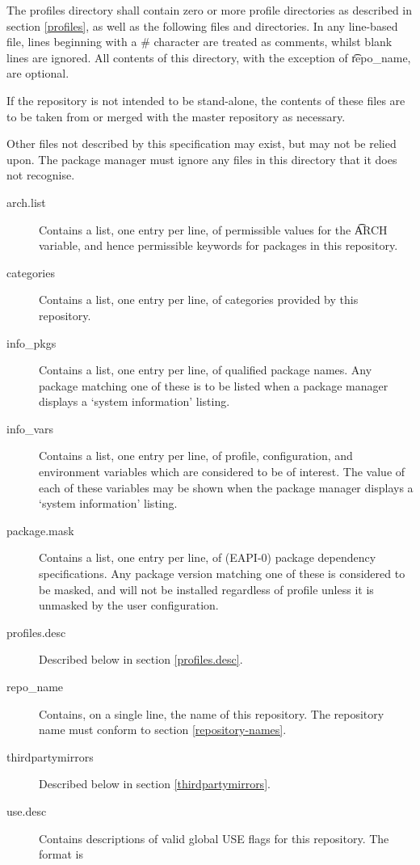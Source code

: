 The profiles directory shall contain zero or more profile directories as described in section
\ref{profiles}, as well as the following files and directories. In any line-based file, lines
beginning with a \# character are treated as comments, whilst blank lines are ignored. All contents
of this directory, with the exception of \t{repo\_name}, are optional.

If the repository is not intended to be stand-alone, the contents of these files are to be taken
from or merged with the master repository as necessary.

Other files not described by this specification may exist, but may not be relied upon. The package
manager must ignore any files in this directory that it does not recognise.

\begin{description}
\item[arch.list] \label{arch.list} Contains a list, one entry per line, of permissible values for
    the \t{ARCH} variable, and hence permissible keywords for packages in this repository.
\item[categories] \label{profiles-categories} Contains a list, one entry per line, of categories
    provided by this repository.
\item[info\_pkgs] Contains a list, one entry per line, of qualified package names. Any package
    matching one of these is to be listed when a package manager displays a `system information'
    listing.
\item[info\_vars] Contains a list, one entry per line, of profile, configuration, and environment
    variables which are considered to be of interest. The value of each of these variables may be
    shown when the package manager displays a `system information' listing.
\item[package.mask] \label{profiles-package.mask}
    Contains a list, one entry per line, of (EAPI-0) package dependency specifications. Any package
    version matching one of these is considered to be masked, and will not be installed regardless
    of profile unless it is unmasked by the user configuration.
\item[profiles.desc] Described below in section \ref{profiles.desc}.
\item[repo\_name] Contains, on a single line, the name of this repository. The repository name must
    conform to section \ref{repository-names}.
\item[thirdpartymirrors] Described below in section \ref{thirdpartymirrors}.
\item[use.desc] Contains descriptions of valid global USE flags for this repository. The format is

\end{description}
